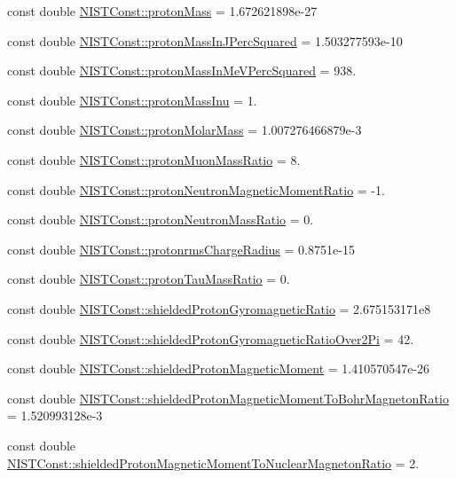 \begin{DoxyCompactItemize}
\item 
const double \hyperlink{group___proton_gaa6738785a6bf04323231318dd6b2ed90}{N\+I\+S\+T\+Const\+::proton\+Mass} = 1.\+672621898e-\/27
\item 
const double \hyperlink{group___proton_gae46a62aa4ccd40b74db6a45a3933cf0f}{N\+I\+S\+T\+Const\+::proton\+Mass\+In\+J\+Perc\+Squared} = 1.\+503277593e-\/10
\item 
const double \hyperlink{group___proton_gad2f4fab753bd216193f8c31ced93d46d}{N\+I\+S\+T\+Const\+::proton\+Mass\+In\+Me\+V\+Perc\+Squared} = 938.
\item 
const double \hyperlink{group___proton_gaf2a9916164fce50112bd8bbe8b712e5a}{N\+I\+S\+T\+Const\+::proton\+Mass\+Inu} = 1.
\item 
const double \hyperlink{group___proton_ga8a29760b90301104dbd9512674eccc4c}{N\+I\+S\+T\+Const\+::proton\+Molar\+Mass} = 1.\+007276466879e-\/3
\item 
const double \hyperlink{group___proton_gab9c5458c70434c20a8527661c4ff0b73}{N\+I\+S\+T\+Const\+::proton\+Muon\+Mass\+Ratio} = 8.
\item 
const double \hyperlink{group___proton_ga349fed5e91e8d7f8d71ba45405da64e7}{N\+I\+S\+T\+Const\+::proton\+Neutron\+Magnetic\+Moment\+Ratio} = -\/1.
\item 
const double \hyperlink{group___proton_ga8b54a81cc7dec7f196f874dcc81dbab2}{N\+I\+S\+T\+Const\+::proton\+Neutron\+Mass\+Ratio} = 0.
\item 
const double \hyperlink{group___proton_gadc726e50679ce96f2d6c0e84c378998e}{N\+I\+S\+T\+Const\+::protonrms\+Charge\+Radius} = 0.\+8751e-\/15
\item 
const double \hyperlink{group___proton_ga6b8624fb113601433f311bb5d3423115}{N\+I\+S\+T\+Const\+::proton\+Tau\+Mass\+Ratio} = 0.
\item 
const double \hyperlink{group___proton_ga2affce442da8b445cce1c580b41bbd82}{N\+I\+S\+T\+Const\+::shielded\+Proton\+Gyromagnetic\+Ratio} = 2.\+675153171e8
\item 
const double \hyperlink{group___proton_ga5b2d223ede8fc141af04cef0486c2c52}{N\+I\+S\+T\+Const\+::shielded\+Proton\+Gyromagnetic\+Ratio\+Over2\+Pi} = 42.
\item 
const double \hyperlink{group___proton_ga3e2c09881642d47d3e869c7803862e6f}{N\+I\+S\+T\+Const\+::shielded\+Proton\+Magnetic\+Moment} = 1.\+410570547e-\/26
\item 
const double \hyperlink{group___proton_ga175eb518370bc31471e8ad763e760b72}{N\+I\+S\+T\+Const\+::shielded\+Proton\+Magnetic\+Moment\+To\+Bohr\+Magneton\+Ratio} = 1.\+520993128e-\/3
\item 
const double \hyperlink{group___proton_ga03e84ef0d1452fa7c647f8866913fbc3}{N\+I\+S\+T\+Const\+::shielded\+Proton\+Magnetic\+Moment\+To\+Nuclear\+Magneton\+Ratio} = 2.
\end{DoxyCompactItemize}



